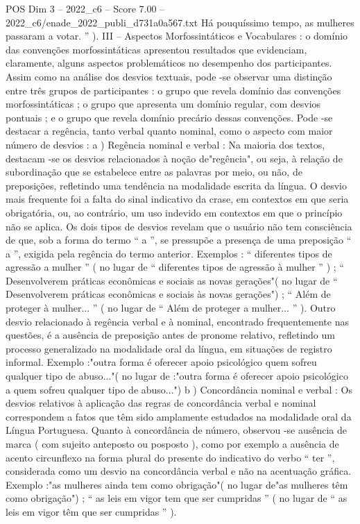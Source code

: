 \begin{textsample}{POS Dim 3 – 2022\_c6 – Score 7.00 – 2022\_c6/enade\_2022\_publi\_d731a0a567.txt}
Há pouquíssimo tempo, as mulheres passaram a votar. ” ).
III – Aspectos Morfossintáticos e Vocabulares : o domínio das convenções morfossintáticas apresentou resultados que evidenciam, claramente, alguns aspectos problemáticos no desempenho dos participantes.
Assim como na análise dos desvios textuais, pode -se observar uma distinção entre três grupos de participantes : o grupo que revela domínio das convenções morfossintáticas ; o grupo que apresenta um domínio regular, com desvios pontuais ; e o grupo que revela domínio precário dessas convenções.
Pode -se destacar a regência, tanto verbal quanto nominal, como o aspecto com maior número de desvios : a ) Regência nominal e verbal : Na maioria dos textos, destacam -se os desvios relacionados à noção de"regência", ou seja, à relação de subordinação que se estabelece entre as palavras por meio, ou não, de preposições, refletindo uma tendência na modalidade escrita da língua.
O desvio mais frequente foi a falta do sinal indicativo da crase, em contextos em que seria obrigatória, ou, ao contrário, um uso indevido em contextos em que o princípio não se aplica.
Os dois tipos de desvios revelam que o usuário não tem consciência de que, sob a forma do termo “ a ”, se pressupõe a presença de uma preposição “ a ”, exigida pela regência do termo anterior.
Exemplos : “ diferentes tipos de agressão a mulher ” ( no lugar de “ diferentes tipos de agressão à mulher ” ) ; “ Desenvolverem práticas econômicas e sociais as novas gerações"( no lugar de “ Desenvolverem práticas econômicas e sociais às novas gerações") ; “ Além de proteger à mulher... ” ( no lugar de “ Além de proteger a mulher... ” ).
Outro desvio relacionado à regência verbal e à nominal, encontrado frequentemente nas questões, é a ausência de preposição antes de pronome relativo, refletindo um processo generalizado na modalidade oral da língua, em situações de registro informal.
Exemplo :"outra forma é oferecer apoio psicológico quem sofreu qualquer tipo de abuso..."( no lugar de :"outra forma é oferecer apoio psicológico a quem sofreu qualquer tipo de abuso...") b ) Concordância nominal e verbal : Os desvios relativos à aplicação das regras de concordância verbal e nominal correspondem a fatos que têm sido amplamente estudados na modalidade oral da Língua Portuguesa.
Quanto à concordância de número, observou -se ausência de marca ( com sujeito anteposto ou posposto ), como por exemplo a ausência de acento circunflexo na forma plural do presente do indicativo do verbo “ ter ”, considerada como um desvio na concordância verbal e não na acentuação gráfica.
Exemplo :"as mulheres ainda tem como obrigação"( no lugar de"as mulheres têm como obrigação") ; “ as leis em vigor tem que ser cumpridas ” ( no lugar de “ as leis em vigor têm que ser cumpridas ” ).

\end{textsample}
